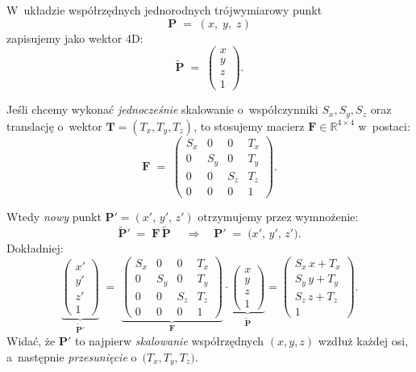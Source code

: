 \noindent
W~układzie współrzędnych jednorodnych trójwymiarowy punkt 
\[
\mathbf{P} 
\;=\; 
(x,\;y,\;z)
\]
zapisujemy jako wektor 4D:
\[
\widetilde{\mathbf{P}}
\;=\;
\begin{pmatrix}
x\\[3pt]
y\\[3pt]
z\\[3pt]
1
\end{pmatrix}.
\]

\medskip

\noindent
Jeśli chcemy wykonać \emph{jednocześnie} skalowanie o~współczynniki 
\(S_x, S_y, S_z\) oraz translację o~wektor \(\mathbf{T} = (T_x, T_y, T_z)\),
to stosujemy macierz \(\mathbf{F} \in \mathbb{R}^{4\times 4}\) w~postaci:
\[
\mathbf{F}
\;=\;
\begin{pmatrix}
S_x & 0   & 0   & T_x \\[4pt]
0   & S_y & 0   & T_y \\[4pt]
0   & 0   & S_z & T_z \\[4pt]
0   & 0   & 0   & 1
\end{pmatrix}.
\]

\medskip

\noindent
Wtedy \emph{nowy} punkt 
\(\mathbf{P}' = (x',\,y',\,z')\)
otrzymujemy przez wymnożenie:
\[
\widetilde{\mathbf{P}}'
\;=\;
\mathbf{F}\,\widetilde{\mathbf{P}}
\;\quad\Longrightarrow\quad
\mathbf{P}'
\;=\;
\bigl(x',\,y',\,z'\bigr).
\]
Dokładniej:
\[
\underbrace{
\begin{pmatrix}
x'\\[3pt]
y'\\[3pt]
z'\\[3pt]
1
\end{pmatrix}
}_{\widetilde{\mathbf{P}}'}
\;=\;
\underbrace{
\begin{pmatrix}
S_x & 0   & 0   & T_x \\[4pt]
0   & S_y & 0   & T_y \\[4pt]
0   & 0   & S_z & T_z \\[4pt]
0   & 0   & 0   & 1
\end{pmatrix}
}_{\mathbf{F}}
\cdot
\underbrace{
\begin{pmatrix}
x\\[2pt]
y\\[2pt]
z\\[2pt]
1
\end{pmatrix}
}_{\widetilde{\mathbf{P}}}
=
\begin{pmatrix}
S_x\,x + T_x\\[3pt]
S_y\,y + T_y\\[3pt]
S_z\,z + T_z\\[3pt]
1
\end{pmatrix}.
\]
Widać, że \(\mathbf{P}'\) to najpierw \emph{skalowanie} współrzędnych 
\((x,y,z)\)
wzdłuż każdej osi, a~następnie \emph{przesunięcie} o~\(\bigl(T_x, T_y, T_z\bigr)\).


